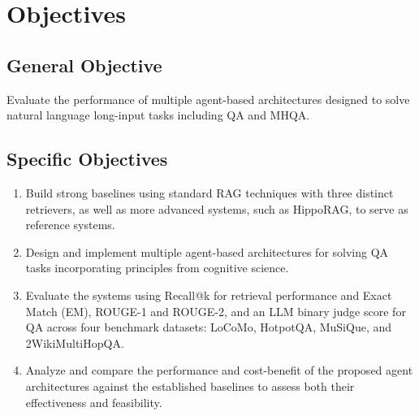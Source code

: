 \section{Objectives}
\label{sec:objectives}

\subsection{General Objective}
Evaluate the performance of multiple agent-based architectures designed to solve natural language long-input tasks including QA and MHQA.

\subsection{Specific Objectives}

\begin{enumerate}
    \item Build strong baselines using standard RAG techniques with three distinct retrievers, as well as more advanced systems, such as HippoRAG, to serve as reference systems.
    \item Design and implement multiple agent-based architectures for solving QA tasks incorporating principles from cognitive science.
    \item Evaluate the systems using Recall@k for retrieval performance and Exact Match (EM), ROUGE-1 and ROUGE-2, and an LLM binary judge score for QA across four benchmark datasets: LoCoMo, HotpotQA, MuSiQue, and 2WikiMultiHopQA.
    \item Analyze and compare the performance and cost-benefit of the proposed agent architectures against the established baselines to assess both their effectiveness and feasibility.
\end{enumerate}